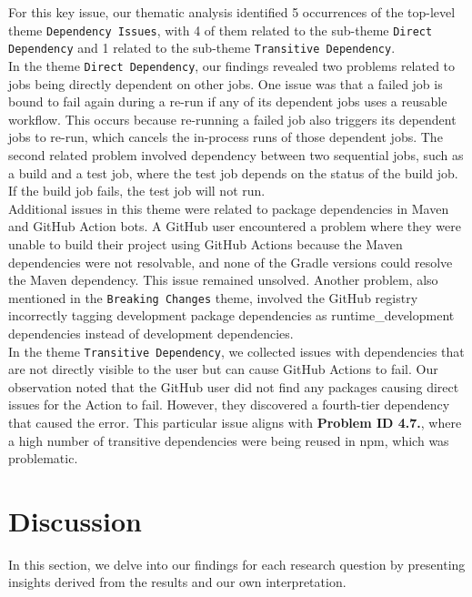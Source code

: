 \documentclass[conference]{IEEEtran}
\begin{document}
	For this key issue, our thematic analysis identified 5 occurrences of the top-level theme \texttt{Dependency Issues}, with 4 of them related to the sub-theme \texttt{Direct Dependency} and 1 related to the sub-theme \texttt{Transitive Dependency}.\\
	In the theme \texttt{Direct Dependency}, our findings revealed two problems related to jobs being directly dependent on other jobs. One issue was that a failed job is bound to fail again during a re-run if any of its dependent jobs uses a reusable workflow. This occurs because re-running a failed job also triggers its dependent jobs to re-run, which cancels the in-process runs of those dependent jobs. The second related problem involved dependency between two sequential jobs, such as a build and a test job, where the test job depends on the status of the build job. If the build job fails, the test job will not run.\\
	Additional issues in this theme were related to package dependencies in Maven and GitHub Action bots. A GitHub user encountered a problem where they were unable to build their project using GitHub Actions because the Maven dependencies were not resolvable, and none of the Gradle versions could resolve the Maven dependency. This issue remained unsolved. Another problem, also mentioned in the \texttt{Breaking Changes} theme, involved the GitHub registry incorrectly tagging development package dependencies as runtime\_development dependencies instead of development dependencies.\\
	In the theme \texttt{Transitive Dependency}, we collected issues with dependencies that are not directly visible to the user but can cause GitHub Actions to fail. Our observation noted that the GitHub user did not find any packages causing direct issues for the Action to fail. However, they discovered a fourth-tier dependency that caused the error. This particular issue aligns with \textbf{Problem ID 4.7.}, where a high number of transitive dependencies were being reused in npm, which was problematic.
\section{Discussion}
	In this section, we delve into our findings for each research question by presenting insights derived from the results and our own interpretation.\\
\end{document}
